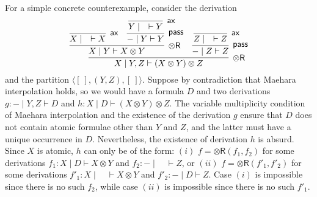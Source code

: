 \documentclass[sn-mathphys-num]{sn-jnl}%
\newcommand{\GG}{\Gamma}
\newcommand{\GD}{\Delta}
\newcommand{\vd}{\vdash}
\newcommand{\tl}{\otimes \mathsf{L}}
\newcommand{\tr}{\otimes\mathsf{R}}
\newcommand{\pass}{\mathsf{pass}}
\newcommand{\ax}{\mathsf{ax}}
\newcommand{\ot}{\otimes}
\newcommand{\SkNMILL}{$\mathtt{SkNMILL}$}
\newcommand{\mf}[1]{\mathsf{#1}}
\theoremstyle{thmstyleone}%
\theoremstyle{thmstyletwo}%
\theoremstyle{thmstylethree}%
\begin{document}
For a simple concrete counterexample, consider the derivation
\begin{equation*}
  \infer[\tr]{X \mid Y, Z \vd (X\ot Y)\ot Z}{
  \infer[\tr]{X \mid Y \vd X \ot Y}{
  \infer[\ax]{X \mid \quad \vd X}{}
  &
  \infer[\pass]{{-} \mid Y \vd Y}{
  \infer[\ax]{Y \mid \quad \vd Y}{}
  }
  }
  &
  \infer[\pass]{{-} \mid Z \vd Z}{
  \infer[\ax]{Z \mid \quad \vd Z}{}
  }
  }
\end{equation*}
and the partition $\langle [\ ], (Y,Z), [\ ]\rangle$. Suppose by contradiction that Maehara interpolation holds, so we would have a formula $D$ and two derivations $g: {-} \mid Y, Z \vd D$ and $h : X \mid D \vd (X\ot Y)\ot Z$.
The variable multiplicity condition of Maehara interpolation and the existence of the derivation $g$ ensure that $D$ does not contain atomic formulae other than $Y$ and $Z$, and the latter must have a unique occurrence in $D$. Nevertheless, the existence of derivation $h$ is absurd. Since $X$ is atomic, $h$ can only be of the form: $(i)$ $f = \tr(f_1,f_2)$ for some derivations $f_1 : X \mid D \vd X \ot Y$ and $f_2 : {-} \mid \quad \vd Z$, or $(ii)$ $f = \tr(f'_1,f'_2)$ for some derivations $f'_1 : X \mid \quad \vd X \ot Y$ and $f'_2 : {-} \mid D \vd Z$. Case $(i)$ is impossible since there is no such $f_2$, while case $(ii)$ is impossible since there is no such $f'_1$.
\end{document}

